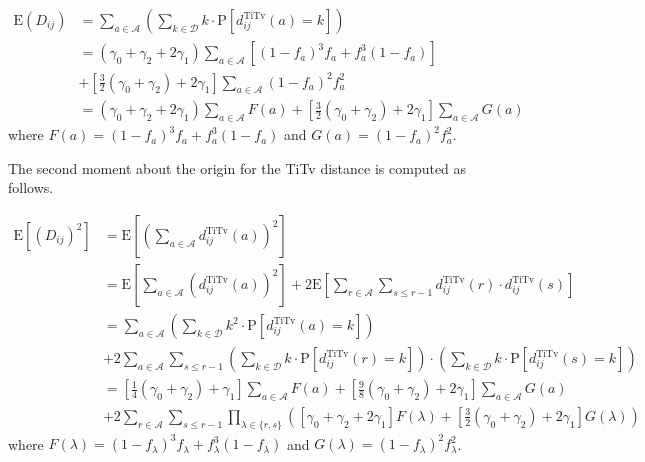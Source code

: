 \documentclass[10pt,letterpaper]{article}\usepackage[]{graphicx}\usepackage[]{color}
\begin{document}
\begin{equation}\label{eq:mu_DDistr_TiTv}
\begin{aligned}
\text{E}(D_{ij}) &= \sum_{a \in \mathcal{A}} \left(\sum_{k \in \mathcal{D}} k \cdot \text{P}\left[d^\text{TiTv}_{ij}(a) = k\right]\right) \\
&= (\gamma_0 + \gamma_2 + 2\gamma_1) \sum_{a \in \mathcal{A}} \left[(1 - f_a)^3 f_a + f^3_a (1 - f_a)\right] \\
&+ \left[\frac{3}{2}(\gamma_0 + \gamma_2) + 2\gamma_1\right] \sum_{a \in \mathcal{A}} (1 - f_a)^2 f^2_a \\
&= (\gamma_0 + \gamma_2 + 2\gamma_1) \sum_{a \in \mathcal{A}} F(a) + \left[\frac{3}{2}(\gamma_0 + \gamma_2) + 2\gamma_1\right] \sum_{a \in \mathcal{A}} G(a)
\end{aligned}
\end{equation}
where $F(a) = (1 - f_a)^3 f_a + f^3_a (1 - f_a)$ and $G(a) = (1 - f_a)^2 f^2_a$.

The second moment about the origin for the TiTv distance is computed as follows.

\begin{equation}\label{eq:mu2_DDistr_TiTv}
\begin{aligned}
\text{E}\left[\left(D_{ij}\right)^2\right] &= \text{E}\left[\left(\sum_{a \in \mathcal{A}} d^\text{TiTv}_{ij}(a)\right)^2\right] \\
&= \text{E}\left[\sum_{a \in \mathcal{A}} \left(d^\text{TiTv}_{ij}(a)\right)^2\right] + 2 \text{E}\left[\sum_{r \in \mathcal{A}} \sum_{s \leq r - 1} d^\text{TiTv}_{ij}(r) \cdot d^\text{TiTv}_{ij}(s)\right] \\
&= \sum_{a \in \mathcal{A}} \left(\sum_{k \in \mathcal{D}} k^2 \cdot \text{P}\left[d^\text{TiTv}_{ij}(a) = k\right]\right) \\
&+ 2\sum_{a \in \mathcal{A}} \sum_{s \leq r - 1} \left(\sum_{k \in \mathcal{D}} k \cdot \text{P}\left[d^\text{TiTv}_{ij}(r) = k\right]\right) \cdot \left(\sum_{k \in \mathcal{D}} k \cdot \text{P}\left[d^\text{TiTv}_{ij}(s) = k\right]\right) \\
&= \left[\frac{1}{4}(\gamma_0 + \gamma_2) + \gamma_1\right] \sum_{a \in \mathcal{A}} F(a) + \left[\frac{9}{8}(\gamma_0 + \gamma_2) + 2\gamma_1\right] \sum_{a \in \mathcal{A}} G(a) \\
&+ 2 \sum_{r \in \mathcal{A}} \sum_{s \leq r - 1} \prod_{\lambda \in \{r,s\}} \left([\gamma_0 + \gamma_2 + 2\gamma_1] F(\lambda) + \left[\frac{3}{2}(\gamma_0 + \gamma_2) + 2\gamma_1\right] G(\lambda)\right)
\end{aligned}
\end{equation}
where $F(\lambda) = (1 - f_\lambda)^3 f_\lambda + f^3_\lambda (1 - f_\lambda)$ and $G(\lambda) = (1 - f_\lambda)^2 f^2_\lambda$.
\end{document}
